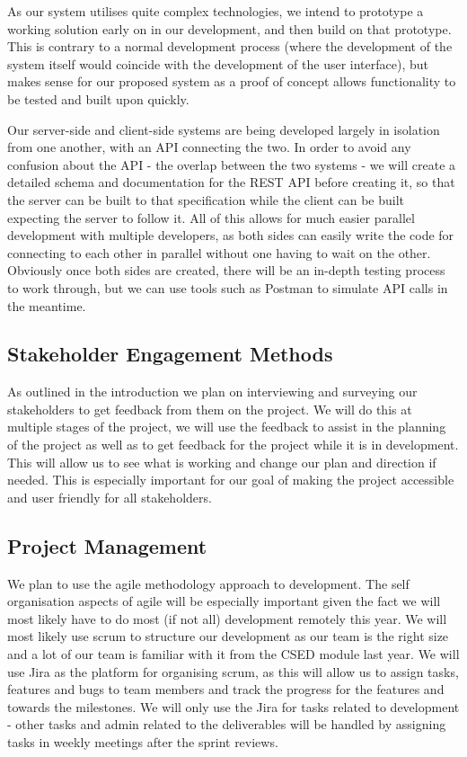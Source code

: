 \documentclass[10pt]{article}
\begin{document}
As our system utilises quite complex technologies, we intend to prototype a working solution early 
on in our development, and then build on that prototype. This is contrary to a normal development 
process (where the development of the system itself would coincide with the development of the user 
interface), but makes sense for our proposed system as a proof of concept allows functionality to be 
tested and built upon quickly. 

Our server-side and client-side systems are being developed largely in isolation from one another, 
with an API connecting the two. In order to avoid any confusion about the API - the overlap between 
the two systems -  we will create a detailed schema and documentation for the REST API before 
creating it, so that the server can be built to that specification while the client can be built 
expecting the server to follow it. All of this allows for much easier parallel development with 
multiple developers, as both sides can easily write the code for connecting to each other in 
parallel without one having to wait on the other. Obviously once both sides are created, there will 
be an in-depth testing process to work through, but we can use tools such as Postman to simulate API 
calls in the meantime. 

\subsection{Stakeholder Engagement Methods}

As outlined in the introduction we plan on interviewing and surveying our stakeholders to get 
feedback from them on the project. We will do this at multiple stages of the project, we will use 
the feedback to assist in the planning of the project as well as to get feedback for the project 
while it is in development. This will allow us to see what is working and change our plan and 
direction if needed. This is especially important for our goal of making the project accessible and 
user friendly for all stakeholders.

\subsection{Project Management}

We plan to use the agile methodology approach to development. The self organisation aspects of agile 
will be especially important given the fact we will most likely have to do most (if not all) 
development remotely this year. We will most likely use scrum to structure our development as our 
team is the right size and a lot of our team is familiar with it from the CSED module last year.  We 
will use Jira as the platform for organising scrum, as this will allow us to assign tasks, features 
and bugs to team members and track the progress for the features and towards the milestones. We will 
only use the Jira for tasks related to development - other tasks and admin related to the 
deliverables will be handled by assigning tasks in weekly meetings after the sprint reviews.
\end{document}
